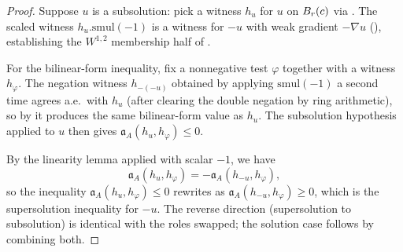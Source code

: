 \begin{proof}
\leanok
{}

Suppose $u$ is a subsolution: pick a witness $h_u$ for $u$ on $B_{r}(c)$
via . The scaled witness
$h_u.\mathrm{smul}(-1)$ is a witness for $-u$ with weak gradient $-\nabla u$
(), establishing the $W^{1,2}$ membership half
of .

For the bilinear-form inequality, fix a nonnegative test $\varphi$ together
with a witness $h_\varphi$. The negation witness $h_{-(-u)}$ obtained by
applying $\mathrm{smul}(-1)$ a second time agrees a.e.\ with $h_u$
(after clearing the double negation by ring arithmetic), so by
 it produces the same bilinear-form
value as $h_u$. The subsolution hypothesis applied to $u$ then gives
$\mathfrak{a}_A(h_u, h_\varphi) \le 0$.

By the linearity lemma  applied with
scalar $-1$, we have
\begin{equation*}
  \mathfrak{a}_A(h_u, h_\varphi)
  = -\mathfrak{a}_A(h_{-u}, h_\varphi),
\end{equation*}
so the inequality $\mathfrak{a}_A(h_u, h_\varphi) \le 0$ rewrites as
$\mathfrak{a}_A(h_{-u}, h_\varphi) \ge 0$, which is the supersolution
inequality for $-u$. The reverse direction (supersolution to subsolution) is
identical with the roles swapped; the solution case follows by combining
both.
\end{proof}


